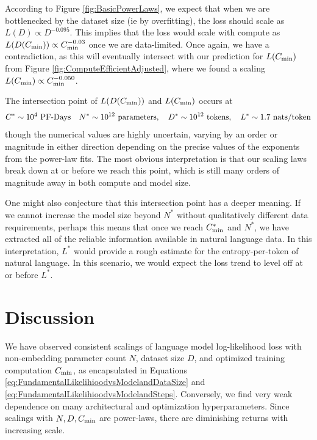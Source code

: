 \documentclass[english]{article}
\newcommand{\be}{\begin{equation}}
\newcommand{\ee}{\end{equation}}
\begin{document}
 
According to Figure \ref{fig:BasicPowerLaws}, we expect that when we are bottlenecked by the dataset size (ie by overfitting), the loss should scale as $L(D) \propto D^{-0.095}$.  This implies that the loss would scale with compute as $L(D(C_{\rm min})) \propto C_{\rm min}^{-0.03}$ once we are data-limited.  Once again, we have a contradiction, as this will eventually intersect with our prediction for $L(C_{\rm min})$ from Figure \ref{fig:ComputeEfficientAdjusted}, where we found a scaling $L(C_{\rm min}) \propto C_{\rm min}^{-0.050}$.  

The intersection point of $L(D(C_{\rm min}))$ and $L(C_{\rm min})$ occurs at
\be
C^* \sim 10^4~\mathrm{PF}{\text -}\mathrm{Days}
\quad
N^* \sim 10^{12}~\text{parameters},
\quad
D^* \sim 10^{12}~\text{tokens},
\quad
L^* \sim 1.7~\text{nats/token}
\label{eq:SpecialPoint}
\ee
though the numerical values are highly uncertain, varying by an order or magnitude in either direction depending on the precise values of the exponents from the power-law fits.  The most obvious interpretation is that our scaling laws break down at or before we reach this point, which is still many orders of magnitude away in both compute and model size.  

One might also conjecture that this intersection point has a deeper meaning.  If we cannot increase the model size beyond $N^*$ without qualitatively different data requirements, perhaps this means that once we reach $C_{\rm min}^*$ and $N^*$, we have extracted all of the reliable information available in natural language data.  In this interpretation, $L^*$ would provide a rough estimate for the entropy-per-token of natural language.  In this scenario, we would expect the loss trend to level off at or before $L^*$.

\section{Discussion}


We have observed consistent scalings of language model log-likelihood loss with non-embedding parameter count $N$, dataset size $D$, and optimized training computation $C_{\rm min}$, as encapsulated in Equations \eqref{eq:FundamentalLikelihioodvsModelandDataSize} and \eqref{eq:FundamentalLikelihioodvsModelandSteps}.  Conversely, we find very weak dependence on many architectural and optimization hyperparameters.  Since scalings with $N, D, C_{\rm min}$ are power-laws, there are diminishing returns with increasing scale.
\end{document}
